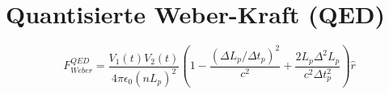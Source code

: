 \section{Quantisierte Weber-Kraft (QED)}
\[ F_{Weber}^{QED} = \frac{V_1(t) V_2(t)}{4\pi\epsilon_0 (nL_p)^2} \left(1 - \frac{(\Delta L_p / \Delta t_p)^2}{c^2} + \frac{2 L_p \Delta^2 L_p}{c^2 \Delta t_p^2}\right)\hat{r} \]